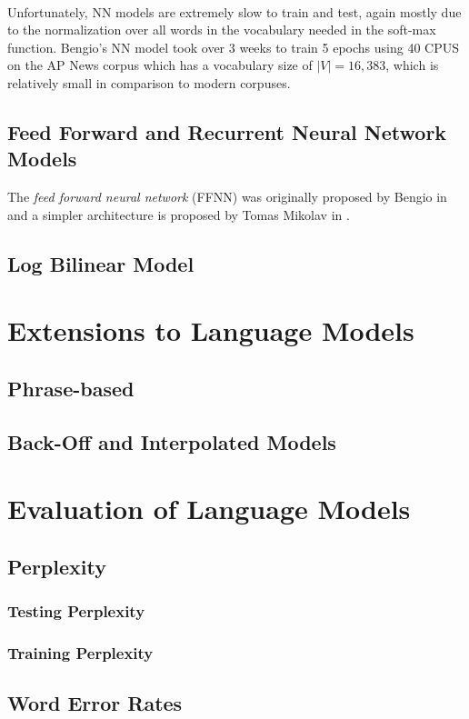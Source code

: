 \documentclass[12pt]{ociamthesis}
\begin{document}
\paragraph{}
Unfortunately, NN models are extremely slow to train and test, again mostly due to the normalization over all words in the vocabulary needed in the soft-max function. Bengio's NN model took over 3 weeks to train 5 epochs using 40 CPUS on the AP News corpus which has a vocabulary size of $|V|=16,383$, which is relatively small in comparison to modern corpuses.

\subsection{Feed Forward and Recurrent Neural Network Models}
The \emph{feed forward neural network} (FFNN) was originally proposed by Bengio in \cite{Bengio2003} and  a simpler architecture is proposed by Tomas Mikolav in \cite{Mikolov2009}.
\subsection{Log Bilinear Model}
\cite{MnihHinton2007}


\section {Extensions to Language Models}
\subsection{Phrase-based}
\subsection{Back-Off and Interpolated Models}

\section {Evaluation of Language Models}
\subsection{Perplexity}
\subsubsection{Testing Perplexity}
\subsubsection{Training Perplexity}
\subsection{Word Error Rates}



 
\end{document}
